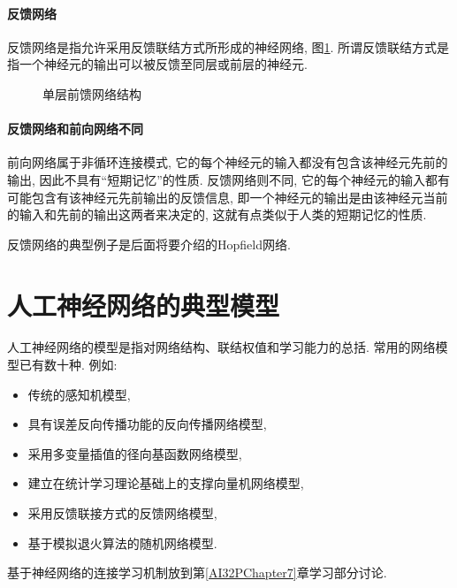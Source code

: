 \paragraph{反馈网络}
反馈网络是指允许采用反馈联结方式所形成的神经网络, 图\ref{AI32fig1202205}. 所谓反馈联结方式是指一个神经元的输出可以被反馈至同层或前层的神经元.
\begin{figure}[H]
\begin{center}
\caption{单层前馈网络结构}
\label{AI32fig1202205}
\end{center}
\end{figure}
\paragraph{反馈网络和前向网络不同}
前向网络属于非循环连接模式, 它的每个神经元的输入都没有包含该神经元先前的输出, 因此不具有“短期记忆”的性质.
反馈网络则不同, 它的每个神经元的输入都有可能包含有该神经元先前输出的反馈信息, 即一个神经元的输出是由该神经元当前的输入和先前的输出这两者来决定的, 这就有点类似于人类的短期记忆的性质.
\begin{remark}
    反馈网络的典型例子是后面将要介绍的Hopfield网络.
\end{remark}
\section{人工神经网络的典型模型}
人工神经网络的模型是指对网络结构、联结权值和学习能力的总括. 常用的网络模型已有数十种. 例如:
\begin{itemize}
\item 传统的感知机模型,
\item 具有误差反向传播功能的反向传播网络模型,
\item 采用多变量插值的径向基函数网络模型,
\item 建立在统计学习理论基础上的支撑向量机网络模型,
\item 采用反馈联接方式的反馈网络模型,
\item 基于模拟退火算法的随机网络模型.
\end{itemize}
基于神经网络的连接学习机制放到第\ref{AI32PChapter7}章学习部分讨论.

